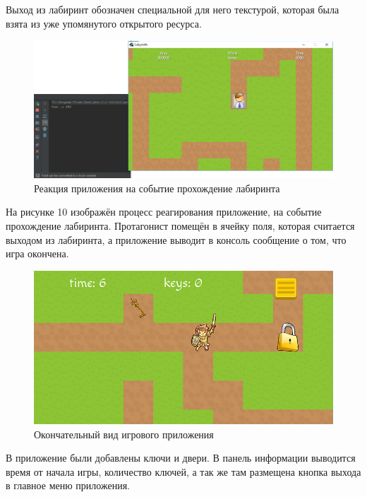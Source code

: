 Выход из лабиринт обозначен специальной для него текстурой, которая была взята из уже упомянутого открытого ресурса.

\begin{figure}[H]
	\begin{center}
		\includegraphics[scale=0.7]{pics/09.png}
		\caption{Реакция приложения на событие прохождение лабиринта} 
		\label{pic:pic_name} %
	\end{center}
\end{figure}

На рисунке 10 изображён процесс реагирования приложение, на событие прохождение лабиринта. Протагонист помещён в ячейку поля, которая считается выходом из лабиринта, а приложение выводит в консоль сообщение о том, что игра окончена.


\begin{figure}[H]
	\begin{center}
		\includegraphics[scale=0.7]{pics/11.png}
		\caption{Окончательный вид игрового приложения} 
		\label{pic:pic_name} %
	\end{center}
\end{figure}

В приложение были добавлены ключи и двери. В панель информации выводится время от начала игры, количество ключей, а так же там размещена кнопка выхода в главное меню приложения.

